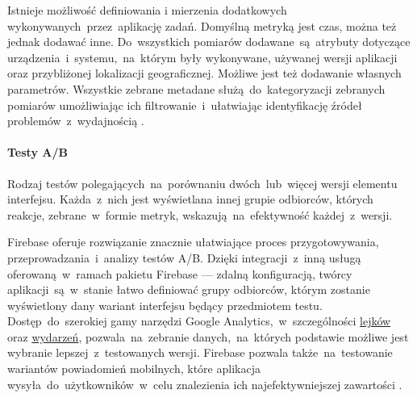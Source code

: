 Istnieje możliwość definiowania i mierzenia dodatkowych wykonywanych~przez~aplikację zadań. Domyślną metryką jest czas, można też jednak dodawać inne. Do~wszystkich pomiarów dodawane~są~atrybuty dotyczące urządzenia~i~systemu,~na~którym były wykonywane, używanej wersji aplikacji oraz przybliżonej lokalizacji geograficznej. Możliwe jest też dodawanie własnych parametrów. Wszystkie zebrane metadane służą~do~kategoryzacji zebranych pomiarów umożliwiając ich  filtrowanie~i~ułatwiając identyfikację źródeł problemów~z~wydajnością \cite{Fb_Pref_Monitor}.

\paragraph{Testy A/B}
Rodzaj testów polegających~na~porównaniu dwóch~lub~więcej wersji elementu interfejsu. Każda~z~nich jest wyświetlana innej grupie odbiorców, których reakcje, zebrane~w~formie metryk, wskazują~na~efektywność każdej~z~wersji. 

Firebase oferuje rozwiązanie znacznie ułatwiające proces przygotowywania, przeprowadzania~i~analizy testów A/B. Dzięki integracji~z~inną usługą oferowaną~w~ramach pakietu Firebase --- zdalną konfiguracją, twórcy aplikacji~są~w~stanie łatwo definiować grupy odbiorców, którym zostanie wyświetlony dany wariant interfejsu będący przedmiotem testu. Dostęp~do~szerokiej gamy narzędzi Google Analytics,~w~szczególności \hyperref[par:ga-funnels]{lejków} oraz  \hyperref[par:ga-events]{wydarzeń}, pozwala~na~zebranie danych,~na~których podstawie możliwe jest wybranie lepszej~z~testowanych wersji. Firebase pozwala także~na~testowanie wariantów powiadomień mobilnych, które aplikacja wysyła~do~użytkowników~w~celu znalezienia ich najefektywniejszej zawartości \cite{Fb_AB_Testing}.
